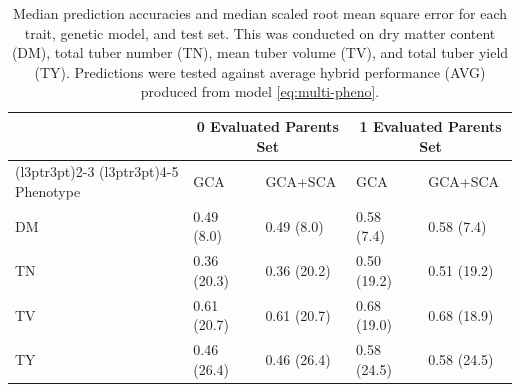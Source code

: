 \begin{refsection}
\begin{table}[htbp]
    \caption{Median prediction accuracies and median scaled root mean square error for each trait, genetic model, and test set. This was conducted on dry matter content (DM), total tuber number (TN), mean tuber volume (TV), and total tuber yield (TY). Predictions were tested against average hybrid performance (AVG) produced from model \ref{eq:multi-pheno}.
 \label{tbl:pa}}
 \centering
\begin{tabular}{lllll}
\toprule
\multicolumn{1}{c}{} & \multicolumn{2}{c}{0 Evaluated Parents Set} & \multicolumn{2}{c}{1 Evaluated Parents Set} \\
\cmidrule(l{3pt}r{3pt}){2-3} \cmidrule(l{3pt}r{3pt}){4-5}
Phenotype & GCA & GCA+SCA & GCA & GCA+SCA\\
\midrule
DM & 0.49 (8.0) & 0.49 (8.0) & 0.58 (7.4) & 0.58 (7.4)\\
TN & 0.36 (20.3) & 0.36 (20.2) & 0.50 (19.2) & 0.51 (19.2)\\
TV & 0.61 (20.7) & 0.61 (20.7) & 0.68 (19.0) & 0.68 (18.9)\\
TY & 0.46 (26.4) & 0.46 (26.4) & 0.58 (24.5) & 0.58 (24.5)\\
\bottomrule
\end{tabular}
\end{table}


\end{refsection}
